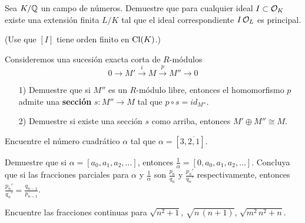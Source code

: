 \begin{ejercicio}
  Sea $K/\mathbb{Q}$ un campo de números. Demuestre que para cualquier ideal
  $I \subset \mathcal{O}_K$ existe una extensión finita $L/K$ tal que el ideal
  correspondiente $I\,\mathcal{O}_L$ es principal.

  \noindent (Use que $[I]$ tiene orden finito en $\operatorname{Cl} (K)$.)
\end{ejercicio}

\begin{ejercicio}
  \label{ejerc:seccion-de-sec}
  Consideremos una sucesión exacta corta de $R$-módulos
  $$0 \to M' \xrightarrow{i} M \xrightarrow{p} M'' \to 0$$

  \begin{enumerate}
  \item[1)] Demuestre que si $M''$ es un $R$-módulo libre, entonces
    el homomorfismo $p$ admite una \textbf{sección} $s\colon M'' \to M$
    tal que $p\circ s = id_{M''}$.

  \item[2)] Demuestre si existe una sección $s$ como arriba, entonces
    $M'\oplus M'' \cong M$.
  \end{enumerate}
\end{ejercicio}

\begin{ejercicio}
  Encuentre el número cuadrático $\alpha$ tal que
  $\alpha = [3, \overline{2,1}]$.
\end{ejercicio}

\begin{ejercicio}
  Demuestre que si $\alpha = [a_0,a_1,a_2,\ldots]$, entonces
  $\frac{1}{\alpha} = [0,a_0,a_1,a_2,\ldots]$. Concluya que si las fracciones
  parciales para $\alpha$ y $\frac{1}{\alpha}$ son $\frac{p_n}{q_n}$ y
  $\frac{p_n'}{q_n'}$ respectivamente, entonces
  $\frac{p_n'}{q_n'} = \frac{q_{n-1}}{p_{n-1}}$.
\end{ejercicio}

\begin{ejercicio}
  Encuentre las fracciones continuas para $\sqrt{n^2+1}$, $\sqrt{n\,(n+1)}$,
  $\sqrt{m^2\,n^2 + n}$.
\end{ejercicio}
